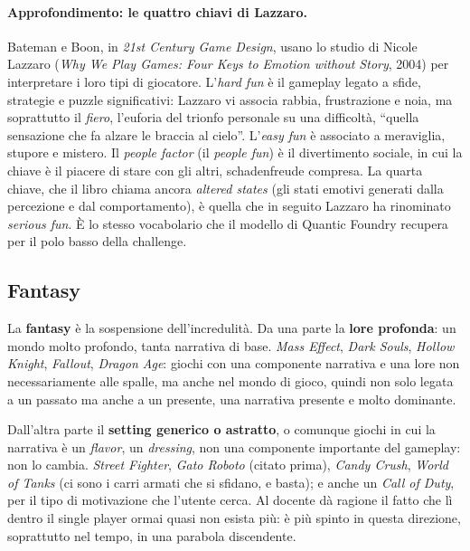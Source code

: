 \paragraph{Approfondimento: le quattro chiavi di Lazzaro.} Bateman e Boon, in
\emph{21st Century Game Design}, usano lo studio di Nicole Lazzaro
(\emph{Why We Play Games: Four Keys to Emotion without Story}, 2004) per
interpretare i loro tipi di giocatore. L'\emph{hard fun} è il gameplay legato
a sfide, strategie e puzzle significativi: Lazzaro vi associa rabbia,
frustrazione e noia, ma soprattutto il \emph{fiero}, l'euforia del trionfo
personale su una difficoltà, ``quella sensazione che fa alzare le braccia al
cielo''. L'\emph{easy fun} è associato a meraviglia, stupore e mistero. Il
\emph{people factor} (il \emph{people fun}) è il divertimento sociale, in cui
la chiave è il piacere di stare con gli altri, schadenfreude compresa. La
quarta chiave, che il libro chiama ancora \emph{altered states} (gli stati
emotivi generati dalla percezione e dal comportamento), è quella che in
seguito Lazzaro ha rinominato \emph{serious fun}. È lo stesso vocabolario che
il modello di Quantic Foundry recupera per il polo basso della challenge.

\subsection{Fantasy}

La \textbf{fantasy} è la sospensione dell'incredulità. Da una parte la
\textbf{lore profonda}: un mondo molto profondo, tanta narrativa di base.
\emph{Mass Effect}, \emph{Dark Souls}, \emph{Hollow Knight}, \emph{Fallout},
\emph{Dragon Age}: giochi con una componente narrativa e una lore non
necessariamente alle spalle, ma anche nel mondo di gioco, quindi non solo
legata a un passato ma anche a un presente, una narrativa presente e molto
dominante.

Dall'altra parte il \textbf{setting generico o astratto}, o comunque giochi in
cui la narrativa è un \emph{flavor}, un \emph{dressing}, non una componente
importante del gameplay: non lo cambia. \emph{Street Fighter}, \emph{Gato
Roboto} (citato prima), \emph{Candy Crush}, \emph{World of Tanks} (ci sono i
carri armati che si sfidano, e basta); e anche un \emph{Call of Duty}, per il
tipo di motivazione che l'utente cerca. Al docente dà ragione il fatto che lì
dentro il single player ormai quasi non esista più: è più spinto in questa
direzione, soprattutto nel tempo, in una parabola discendente.

